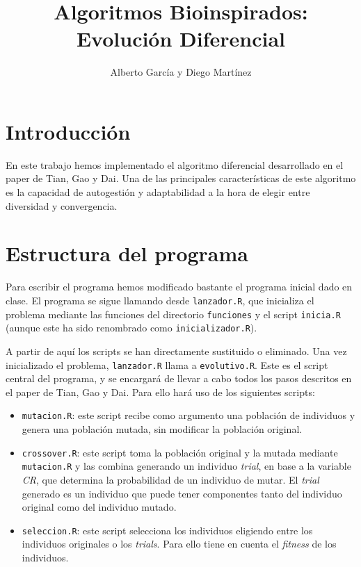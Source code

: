 \documentclass{article}
\title{Algoritmos Bioinspirados: Evolución Diferencial}
\author{Alberto García y Diego Martínez}
\begin{document}
\maketitle
\section{Introducción}
En este trabajo hemos implementado el algoritmo diferencial desarrollado en el paper de Tian, Gao y Dai\cite{mainPaper}. Una de las principales características de este algoritmo es la capacidad de autogestión y adaptabilidad a la hora de elegir entre diversidad y convergencia.

\section{Estructura del programa}
Para escribir el programa hemos modificado bastante el programa inicial dado en clase. El programa se sigue llamando desde \texttt{lanzador.R}, que inicializa el problema mediante las funciones del directorio \texttt{funciones} y el script \texttt{inicia.R} (aunque este ha sido renombrado como \texttt{inicializador.R}).

A partir de aquí los scripts se han directamente sustituido o eliminado. Una vez inicializado el problema, \texttt{lanzador.R} llama a \texttt{evolutivo.R}. Este es el script central del programa, y se encargará de llevar a cabo todos los pasos descritos en el paper de Tian, Gao y Dai\cite{mainPaper}. Para ello hará uso de los siguientes scripts:
\begin{itemize}
    \item \texttt{mutacion.R}: este script recibe como argumento una población de individuos y genera una población mutada, sin modificar la población original.
    \item \texttt{crossover.R}: este script toma la población original y la mutada mediante \texttt{mutacion.R} y las combina generando un individuo \textit{trial}, en base a la variable \textit{CR}, que determina la probabilidad de un individuo de mutar. El \textit{trial} generado es un individuo que puede tener componentes tanto del individuo original como del individuo mutado.
    \item \texttt{seleccion.R}: este script selecciona los individuos eligiendo entre los individuos originales o los \textit{trials}. Para ello tiene en cuenta el \textit{fitness} de los individuos.
\end{itemize}
{}

\end{document}
